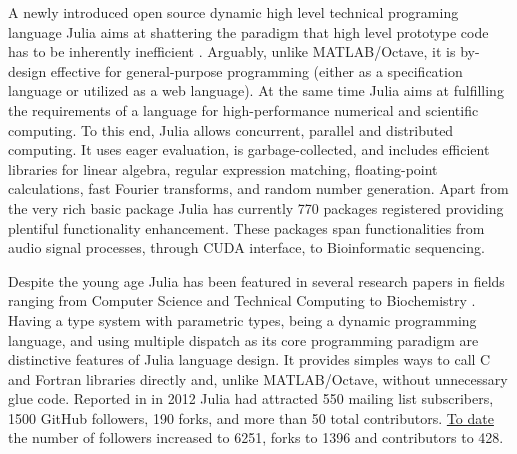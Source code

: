 A newly introduced open source dynamic high level technical programing language Julia aims at shattering the paradigm that high level prototype code has to be inherently inefficient \cite{bezanson2012julia, bezanson2014julia}. Arguably, unlike MATLAB/Octave, it is by-design effective for general-purpose programming (either as a specification language or utilized as a web language). At the same time Julia aims at fulfilling the requirements of a language for high-performance numerical and scientific computing.  To this end, Julia allows concurrent, parallel and distributed computing. It uses eager evaluation, is garbage-collected, and includes efficient libraries for linear algebra, regular expression matching, floating-point calculations, fast Fourier transforms, and random number generation. Apart from the very rich basic package Julia has currently 770 packages registered providing plentiful functionality enhancement. These packages span functionalities from audio signal processes, through CUDA interface, to Bioinformatic sequencing.

Despite the young age Julia has been featured in several research papers in fields ranging from Computer Science and Technical Computing \cite{Heitzinger_2014, Knopp_2014, Foulds_2013} to Biochemistry \cite{Baldassi_2014}. Having a type system with parametric types, being a dynamic programming language, and using multiple dispatch as its core programming paradigm are distinctive features of Julia language design. It provides simples ways to call C and Fortran libraries directly and, unlike MATLAB/Octave, without unnecessary glue code. Reported in \cite{bezanson2012julia} in 2012 Julia had attracted 550 mailing list subscribers, 1500 GitHub followers, 190 forks, and more than 50 total contributors. \href{https://github.com/JuliaLang/julia}{To date} the number of followers increased to 6251, forks to 1396 and contributors to 428. 

